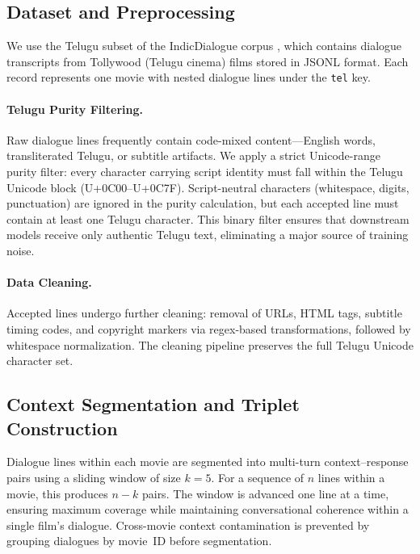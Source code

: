 \documentclass[11pt]{article}
\begin{document}
\subsection{Dataset and Preprocessing}
\label{subsec:dataset}

We use the Telugu subset of the IndicDialogue corpus \citep{bharadwaj-etal-2023-indicdialogue}, which contains dialogue transcripts from Tollywood (Telugu cinema) films stored in JSONL format. Each record represents one movie with nested dialogue lines under the \texttt{tel} key.

\paragraph{Telugu Purity Filtering.}
Raw dialogue lines frequently contain code-mixed content---English words, transliterated Telugu, or subtitle artifacts. We apply a strict Unicode-range purity filter: every character carrying script identity must fall within the Telugu Unicode block (U+0C00--U+0C7F). Script-neutral characters (whitespace, digits, punctuation) are ignored in the purity calculation, but each accepted line must contain at least one Telugu character. This binary filter ensures that downstream models receive only authentic Telugu text, eliminating a major source of training noise.

\paragraph{Data Cleaning.}
Accepted lines undergo further cleaning: removal of URLs, HTML tags, subtitle timing codes, and copyright markers via regex-based transformations, followed by whitespace normalization. The cleaning pipeline preserves the full Telugu Unicode character set.

\subsection{Context Segmentation and Triplet Construction}
\label{subsec:segmentation}

Dialogue lines within each movie are segmented into multi-turn context--response pairs using a sliding window of size $k = 5$. For a sequence of $n$ lines within a movie, this produces $n - k$ pairs. The window is advanced one line at a time, ensuring maximum coverage while maintaining conversational coherence within a single film's dialogue. Cross-movie context contamination is prevented by grouping dialogues by movie~ID before segmentation.
\end{document}
